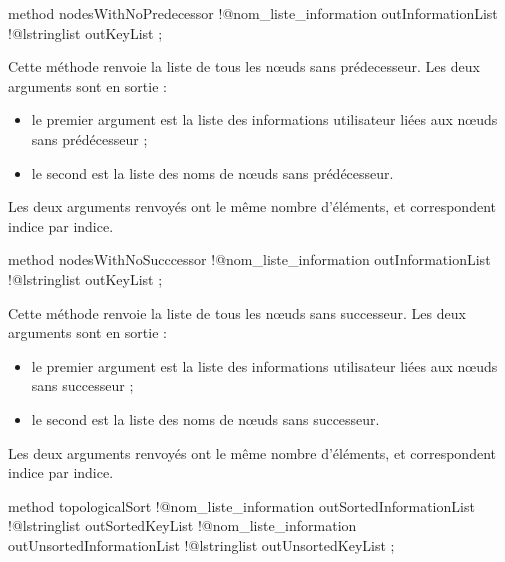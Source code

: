 \begin{galgascode}
method nodesWithNoPredecessor
  !@nom_liste_information outInformationList
  !@lstringlist outKeyList
;
\end{galgascode}

Cette méthode renvoie la liste de tous les nœuds sans prédecesseur. Les deux arguments sont en sortie :
\begin{itemize}
  \item le premier argument  est la liste des informations utilisateur liées aux nœuds sans prédécesseur ;
  \item le second  est la liste des noms de nœuds sans prédécesseur.
\end{itemize}

Les deux arguments renvoyés ont le même nombre d'éléments, et correspondent indice par indice.







\begin{galgascode}
method nodesWithNoSucccessor
  !@nom_liste_information outInformationList
  !@lstringlist outKeyList
;
\end{galgascode}

Cette méthode renvoie la liste de tous les nœuds sans successeur. Les deux arguments sont en sortie :
\begin{itemize}
  \item le premier argument  est la liste des informations utilisateur liées aux nœuds sans successeur ;
  \item le second  est la liste des noms de nœuds sans successeur.
\end{itemize}

Les deux arguments renvoyés ont le même nombre d'éléments, et correspondent indice par indice.






\begin{galgascode}
method topologicalSort
  !@nom_liste_information outSortedInformationList
  !@lstringlist outSortedKeyList
  !@nom_liste_information outUnsortedInformationList
  !@lstringlist outUnsortedKeyList
;
\end{galgascode}

